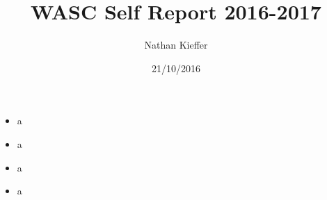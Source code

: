 \documentclass[draft]{report}
\title{WASC Self Report 2016-2017}
\author{Nathan Kieffer}
\date{21/10/2016}
\begin{document}
\AddToShipoutPicture*{\BackgroundPic}
\maketitle


\begin{itemize}
\item a
\item a
\item a
\item a
\end{itemize}
\end{document}
